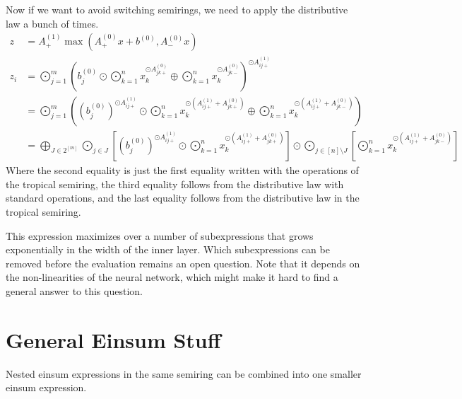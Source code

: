 Now if we want to avoid switching semirings, we need to apply the distributive law a bunch of times.
\begin{align*}
    z   & = A^{(1)}_+ \max(A^{(0)}_+ x + b^{(0)}, A^{(0)}_- x)                                                                                                                                                                                                                                                                                                          \\
    z_i & = \bigodot\limits_{j = 1}^{m}\left(b^{(0)}_j \odot \bigodot\limits_{k = 1}^{n} x_k^{\odot A^{(0)}_{jk+}} \oplus \bigodot\limits_{k = 1}^{n} x_k^{\odot A^{(0)}_{jk-}}\right)^{\odot A^{(1)}_{ij+}}                                                                                                                                                            \\
        & = \bigodot\limits_{j = 1}^{m}\left(\left(b^{(0)}_j\right)^{\odot A^{(1)}_{ij+}} \odot \bigodot\limits_{k = 1}^{n} x_k^{\odot \left(A^{(1)}_{ij+} + A^{(0)}_{jk+}\right)} \oplus \bigodot\limits_{k = 1}^{n} x_k^{\odot \left(A^{(1)}_{ij+} + A^{(0)}_{jk-}\right)}\right)                                                                                     \\
        & = \bigoplus\limits_{J \in 2^{[m]}} \bigodot\limits_{j \in J} \left[\left(b^{(0)}_j\right)^{\odot A^{(1)}_{ij+}} \odot \bigodot\limits_{k = 1}^{n} x_k^{\odot \left(A^{(1)}_{ij+} + A^{(0)}_{jk+}\right)}\right] \odot \bigodot\limits_{j \in [n] \setminus J} \left[\bigodot\limits_{k = 1}^{n} x_k^{\odot \left(A^{(1)}_{ij+} + A^{(0)}_{jk-}\right)}\right]
\end{align*}
Where the second equality is just the first equality written with the operations of the tropical semiring,
the third equality follows from the distributive law with standard operations,
and the last equality follows from the distributive law in the tropical semiring.

This expression maximizes over a number of subexpressions that grows exponentially in the width of the inner layer.
Which subexpressions can be removed before the evaluation remains an open question.
Note that it depends on the non-linearities of the neural network, which might make it hard to find a general answer to this question.

\section{General Einsum Stuff}
Nested einsum expressions in the same semiring can be combined into one smaller einsum expression.

